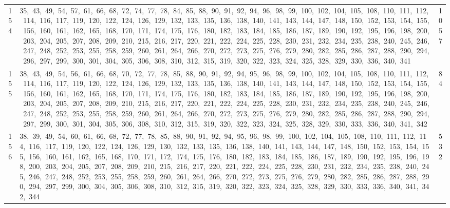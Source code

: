 \begin{longtable}{c|p{}|r}
154 & 35,\ 43,\ 49,\ 54,\ 57,\ 61,\ 66,\ 68,\ 72,\ 74,\ 77,\ 78,\ 84,\ 85,\ 88,\ 90,\ 91,\ 92,\ 94,\ 96,\ 98,\ 99,\ 100,\ 102,\ 104,\ 105,\ 108,\ 110,\ 111,\ 112,\ 114,\ 116,\ 117,\ 119,\ 120,\ 122,\ 124,\ 126,\ 129,\ 132,\ 133,\ 135,\ 136,\ 138,\ 140,\ 141,\ 143,\ 144,\ 147,\ 148,\ 150,\ 152,\ 153,\ 154,\ 155,\ 156,\ 160,\ 161,\ 162,\ 165,\ 168,\ 170,\ 171,\ 174,\ 175,\ 176,\ 180,\ 182,\ 183,\ 184,\ 185,\ 186,\ 187,\ 189,\ 190,\ 192,\ 195,\ 196,\ 198,\ 200,\ 203,\ 204,\ 205,\ 207,\ 208,\ 209,\ 210,\ 215,\ 216,\ 217,\ 220,\ 221,\ 222,\ 224,\ 225,\ 228,\ 230,\ 231,\ 232,\ 234,\ 235,\ 238,\ 240,\ 245,\ 246,\ 247,\ 248,\ 252,\ 253,\ 255,\ 258,\ 259,\ 260,\ 261,\ 264,\ 266,\ 270,\ 272,\ 273,\ 275,\ 276,\ 279,\ 280,\ 282,\ 285,\ 286,\ 287,\ 288,\ 290,\ 294,\ 296,\ 297,\ 299,\ 300,\ 301,\ 304,\ 305,\ 306,\ 308,\ 310,\ 312,\ 315,\ 319,\ 320,\ 322,\ 323,\ 324,\ 325,\ 328,\ 329,\ 330,\ 336,\ 340,\ 341 & 1057 \\
155 & 38,\ 43,\ 49,\ 54,\ 56,\ 61,\ 66,\ 68,\ 70,\ 72,\ 77,\ 78,\ 85,\ 88,\ 90,\ 91,\ 92,\ 94,\ 95,\ 96,\ 98,\ 99,\ 100,\ 102,\ 104,\ 105,\ 108,\ 110,\ 111,\ 112,\ 114,\ 116,\ 117,\ 119,\ 120,\ 122,\ 124,\ 126,\ 129,\ 132,\ 133,\ 135,\ 136,\ 138,\ 140,\ 141,\ 143,\ 144,\ 147,\ 148,\ 150,\ 152,\ 153,\ 154,\ 155,\ 156,\ 160,\ 161,\ 162,\ 165,\ 168,\ 170,\ 171,\ 174,\ 175,\ 176,\ 180,\ 182,\ 183,\ 184,\ 185,\ 186,\ 187,\ 189,\ 190,\ 192,\ 195,\ 196,\ 198,\ 200,\ 203,\ 204,\ 205,\ 207,\ 208,\ 209,\ 210,\ 215,\ 216,\ 217,\ 220,\ 221,\ 222,\ 224,\ 225,\ 228,\ 230,\ 231,\ 232,\ 234,\ 235,\ 238,\ 240,\ 245,\ 246,\ 247,\ 248,\ 252,\ 253,\ 255,\ 258,\ 259,\ 260,\ 261,\ 264,\ 266,\ 270,\ 272,\ 273,\ 275,\ 276,\ 279,\ 280,\ 282,\ 285,\ 286,\ 287,\ 288,\ 290,\ 294,\ 297,\ 299,\ 300,\ 301,\ 304,\ 305,\ 306,\ 308,\ 310,\ 312,\ 315,\ 319,\ 320,\ 322,\ 323,\ 324,\ 325,\ 328,\ 329,\ 330,\ 333,\ 336,\ 340,\ 341,\ 342 & 84 \\
156 & 38,\ 39,\ 49,\ 54,\ 60,\ 61,\ 66,\ 68,\ 72,\ 77,\ 78,\ 85,\ 88,\ 90,\ 91,\ 92,\ 94,\ 95,\ 96,\ 98,\ 99,\ 100,\ 102,\ 104,\ 105,\ 108,\ 110,\ 111,\ 112,\ 114,\ 116,\ 117,\ 119,\ 120,\ 122,\ 124,\ 126,\ 129,\ 130,\ 132,\ 133,\ 135,\ 136,\ 138,\ 140,\ 141,\ 143,\ 144,\ 147,\ 148,\ 150,\ 152,\ 153,\ 154,\ 155,\ 156,\ 160,\ 161,\ 162,\ 165,\ 168,\ 170,\ 171,\ 172,\ 174,\ 175,\ 176,\ 180,\ 182,\ 183,\ 184,\ 185,\ 186,\ 187,\ 189,\ 190,\ 192,\ 195,\ 196,\ 198,\ 200,\ 203,\ 204,\ 205,\ 207,\ 208,\ 209,\ 210,\ 215,\ 216,\ 217,\ 220,\ 221,\ 222,\ 224,\ 225,\ 228,\ 230,\ 231,\ 232,\ 234,\ 235,\ 238,\ 240,\ 245,\ 246,\ 247,\ 248,\ 252,\ 253,\ 255,\ 258,\ 259,\ 260,\ 261,\ 264,\ 266,\ 270,\ 272,\ 273,\ 275,\ 276,\ 279,\ 280,\ 282,\ 285,\ 286,\ 287,\ 288,\ 290,\ 294,\ 297,\ 299,\ 300,\ 304,\ 305,\ 306,\ 308,\ 310,\ 312,\ 315,\ 319,\ 320,\ 322,\ 323,\ 324,\ 325,\ 328,\ 329,\ 330,\ 333,\ 336,\ 340,\ 341,\ 342,\ 344 & 532 \\

\end{longtable}
